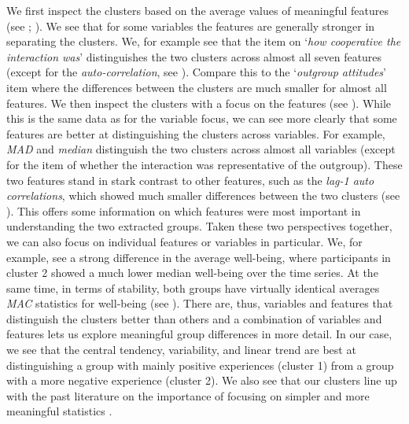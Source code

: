 We first inspect the clusters based on the average values of meaningful
features (see ; \citealp{Kennedy2021}). We
see that for some variables the features are generally stronger in
separating the clusters. We, for example see that the item on
`\textit{how cooperative the interaction was}' distinguishes the two
clusters across almost all seven features (except for the
\textit{auto-correlation}, see ). Compare
this to the `\textit{outgroup attitudes}' item where the differences
between the clusters are much smaller for almost all features. We then
inspect the clusters with a focus on the features (see
). While this is the same data as for the
variable focus, we can see more clearly that some features are better at
distinguishing the clusters across variables. For example, \textit{MAD}
and \textit{median} distinguish the two clusters across almost all
variables (except for the item of whether the interaction was
representative of the outgroup). These two features stand in stark
contrast to other features, such as the
\textit{lag-1 auto correlations}, which showed much smaller differences
between the two clusters (see ). This
offers some information on which features were most important in
understanding the two extracted groups. Taken these two perspectives
together, we can also focus on individual features or variables in
particular. We, for example, see a strong difference in the average
well-being, where participants in cluster 2 showed a much lower median
well-being over the time series. At the same time, in terms of
stability, both groups have virtually identical averages \textit{MAC}
statistics for well-being (see ). There
are, thus, variables and features that distinguish the clusters better
than others and a combination of variables and features lets us explore
meaningful group differences in more detail. In our case, we see that
the central tendency, variability, and linear trend are best at
distinguishing a group with mainly positive experiences (cluster 1) from
a group with a more negative experience (cluster 2). We also see that
our clusters line up with the past literature on the importance of
focusing on simpler and more meaningful statistics
\citep{bringmann2018c, eronen2021a}.

